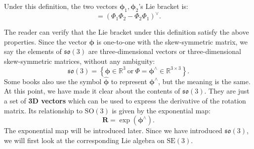 Under this definition, the two vectors $\boldsymbol{\phi}_1, \boldsymbol{\phi}_2$'s Lie bracket is:
\begin{equation}
[\boldsymbol{\phi}_1, \boldsymbol{\phi}_2] = \left( \mathbf{ \varPhi }_1 \mathbf{ \varPhi }_2 - \mathbf{ \varPhi }_2 \mathbf{ \varPhi }_1 \right)^\vee.
\end{equation}

The reader can verify that the Lie bracket under this definition satisfy the above properties. Since the vector $\boldsymbol{\phi}$ is one-to-one with the skew-symmetric matrix, we say the elements of $\mathfrak{so}(3)$ are three-dimensional vectors or three-dimensional skew-symmetric matrices, without any ambiguity:
\begin{equation}
\mathfrak{so}(3) = \left\{ \boldsymbol{\phi} \in \mathbb{R}^3 \ \text{or}\  \boldsymbol{\varPhi} = \boldsymbol{\phi^\wedge} \in \mathbb{ R}^{3 \times 3} \right\}.
\end{equation}
Some books also use the symbol $\widehat{\boldsymbol{\phi}}$ to represent $\boldsymbol{\phi}^\wedge$, but the meaning is the same. At this point, we have made it clear about the contents of $\mathfrak{so}(3)$. They are just a set of \textbf{3D vectors} which can be used to express the derivative of the rotation matrix. Its relationship to $\mathrm{SO}(3)$ is given by the exponential map:
\begin{equation}
\mathbf{R} = \exp ( \boldsymbol{\phi}^\wedge ).
\end{equation}
The exponential map will be introduced later. Since we have introduced $\mathfrak{so}(3)$, we will first look at the corresponding Lie algebra on $\mathrm{SE}(3)$.

